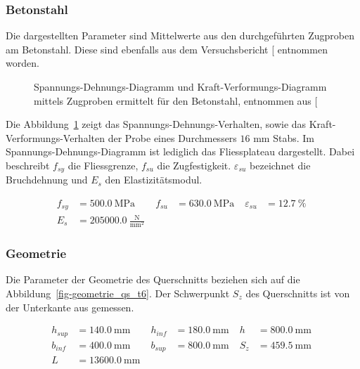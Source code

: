 \documentclass[
  11pt,
  letterpaper,
]{scrreprt}
\begin{document}
\subsubsection{Betonstahl}\label{betonstahl}

Die dargestellten Parameter sind Mittelwerte aus den durchgeführten
Zugproben am Betonstahl. Diese sind ebenfalls aus dem Versuchsbericht
{[}\citeproc{ref-sigrist_versuche_1993}{5}{]} entnommen worden.

\begin{figure}[H]


\caption{\label{fig-sigma_eps_betonstahl}Spannungs-Dehnungs-Diagramm und
Kraft-Verformungs-Diagramm mittels Zugproben ermittelt für den
Betonstahl, entnommen aus {[}\citeproc{ref-sigrist_versuche_1993}{5}{]}}

\end{figure}%

Die Abbildung~\ref{fig-sigma_eps_betonstahl} zeigt das
Spannungs-Dehnungs-Verhalten, sowie das Kraft-Verformungs-Verhalten der
Probe eines Durchmessers \(16\) mm Stabs. Im Spannungs-Dehnungs-Diagramm
ist lediglich das Fliessplateau dargestellt. Dabei beschreibt \(f_{sy}\)
die Fliessgrenze, \(f_{su}\) die Zugfestigkeit. \(\varepsilon_{su}\)
bezeichnet die Bruchdehnung und \(E_s\) den Elastizitätsmodul.

$$
\begin{aligned}
f_{sy} &= 500.0\ \mathrm{MPa} \; 
 &f_{su} &= 630.0\ \mathrm{MPa} \; 
 &\varepsilon_{su} &= 12.7\ \mathrm{\%} \; 
\\[10pt]
 E_{s} &= 205000.0\ \frac{\mathrm{N}}{\mathrm{mm}^{2}} \;
\end{aligned}
$$

\subsubsection{Geometrie}\label{geometrie}

Die Parameter der Geometrie des Querschnitts beziehen sich auf die
Abbildung~\ref{fig-geometrie_qs_t6}. Der Schwerpunkt \(S_z\) des
Querschnitts ist von der Unterkante aus gemessen.

$$
\begin{aligned}
h_{sup} &= 140.0\ \mathrm{mm} \; 
 &h_{inf} &= 180.0\ \mathrm{mm} \; 
 &h &= 800.0\ \mathrm{mm} \; 
\\[10pt]
 b_{inf} &= 400.0\ \mathrm{mm} \; 
 &b_{sup} &= 800.0\ \mathrm{mm} \; 
 &S_{z} &= 459.5\ \mathrm{mm} \; 
\\[10pt]
 L &= 13600.0\ \mathrm{mm} \;
\end{aligned}
$$
\end{document}
